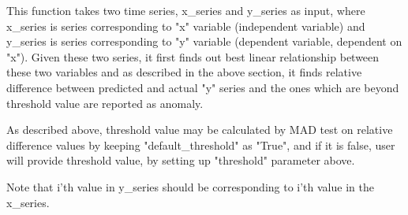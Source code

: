 This function takes two time series, x\_series and y\_series as input, where 
x\_series is series corresponding to "x" variable (independent variable) and 
y\_series is series corresponding to "y" variable (dependent variable, dependent 
on "x"). Given these two series, it first finds out best linear relationship 
between these two variables and as described in the above section, it finds 
relative difference between predicted and actual "y" series and the ones which 
are beyond threshold value are reported as anomaly. 

As described above, threshold value may be calculated by MAD test on relative 
difference values by keeping "default\_threshold" as "True", and if it is false, 
user will provide threshold value, by setting up "threshold" parameter above.

Note that i'th value in y\_series should be corresponding to i'th value in the 
x\_series.

